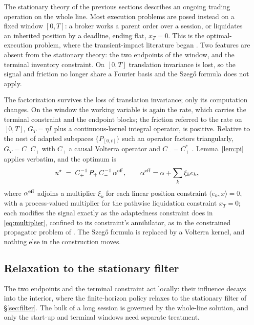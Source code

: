 \documentclass[11pt]{article}
\theoremstyle{plain}
\theoremstyle{definition}
\theoremstyle{remark}
\begin{document}
The stationary theory of the previous sections describes an ongoing trading operation on the whole line. Most execution problems are posed instead on a fixed window $[0,T]$: a broker works a parent order over a session, or liquidates an inherited position by a deadline, ending flat, $x_T=0$. This is the optimal-execution problem, where the transient-impact literature began \citep{AlmgrenChriss2001,ObizhaevaWang2013,GatheralSchiedSlynko2012}. Two features are absent from the stationary theory: the two endpoints of the window, and the terminal inventory constraint. On $[0,T]$ translation invariance is lost, so the signal and friction no longer share a Fourier basis and the Szeg\H{o} formula does not apply.

The factorization survives the loss of translation invariance; only its computation changes. On the window the working variable is again the rate, which carries the terminal constraint and the endpoint blocks; the friction referred to the rate on $[0,T]$, $G_T=\eta I$ plus a continuous-kernel integral operator, is positive. Relative to the nest of adapted subspaces $\{P_{[0,t]}\}$ such an operator factors triangularly, $G_T=C_-C_+$ with $C_+$ a causal Volterra operator and $C_-=C_+^*$ \citep{GohbergKrein1970,Arveson1975}. Lemma~\ref{lem:pi} applies verbatim, and the optimum is
\begin{equation}\label{eq:finiteT}
u^\star \;=\; C_+^{-1}\,P_+\,C_-^{-1}\,\alpha^{\rm eff},
\qquad \alpha^{\rm eff} = \alpha + \sum_k \xi_k e_k,
\end{equation}
where $\alpha^{\rm eff}$ adjoins a multiplier $\xi_k$ for each linear position constraint $\langle e_k,x\rangle=0$, with a process-valued multiplier for the pathwise liquidation constraint $x_T=0$; each modifies the signal exactly as the adaptedness constraint does in \eqref{eq:multiplier}, confined to its constraint's annihilator, as in the constrained propagator problem of \citet{AbiJaberDeCarvalhoPham2024}. The Szeg\H{o} formula is replaced by a Volterra kernel, and nothing else in the construction moves.

\subsection{Relaxation to the stationary filter}\label{sec:bdrylayer}

The two endpoints and the terminal constraint act locally: their influence decays into the interior, where the finite-horizon policy relaxes to the stationary filter of \S\ref{sec:filter}. The bulk of a long session is governed by the whole-line solution, and only the start-up and terminal windows need separate treatment.
\end{document}
